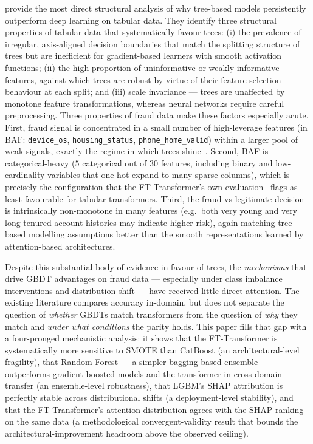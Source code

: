 \documentclass[a4paper,fleqn]{cas-sc}
\begin{document}
\citet{grinsztajn2022tree} provide the most direct structural analysis of why
tree-based models persistently outperform deep learning on tabular data.
They identify three structural properties of tabular data that systematically
favour trees: (i) the prevalence of irregular, axis-aligned decision boundaries
that match the splitting structure of trees but are inefficient for
gradient-based learners with smooth activation functions; (ii) the high
proportion of uninformative or weakly informative features, against which trees
are robust by virtue of their feature-selection behaviour at each split;
and (iii) scale invariance --- trees are unaffected by monotone feature
transformations, whereas neural networks require careful preprocessing.
Three properties of fraud data make these factors especially acute.
First, fraud signal is concentrated in a small number of high-leverage features
(in BAF: \texttt{device\_os}, \texttt{housing\_status}, \texttt{phone\_home\_valid})
within a larger pool of weak signals, exactly the regime in which trees
shine~\citep{grinsztajn2022tree,jesus2022turning}.
Second, BAF is categorical-heavy ($5$ categorical out of $30$ features,
including binary and low-cardinality variables that one-hot expand to many
sparse columns), which is precisely the configuration that the FT-Transformer's
own evaluation~\citep{gorishniy2021revisiting} flags as least favourable for
tabular transformers.
Third, the fraud-vs-legitimate decision is intrinsically non-monotone in many
features (e.g.\ both very young and very long-tenured account histories may
indicate higher risk), again matching tree-based modelling assumptions better
than the smooth representations learned by attention-based architectures.

Despite this substantial body of evidence in favour of trees, the
\emph{mechanisms} that drive GBDT advantages on fraud data --- especially under
class imbalance interventions and distribution shift --- have received little
direct attention.
The existing literature compares accuracy in-domain, but does not separate
the question of \emph{whether} GBDTs match transformers from the question of
\emph{why} they match and \emph{under what conditions} the parity holds.
This paper fills that gap with a four-pronged mechanistic analysis: it shows
that the FT-Transformer is systematically more sensitive to SMOTE than CatBoost
(an architectural-level fragility), that Random Forest --- a simpler
bagging-based ensemble --- outperforms gradient-boosted models and the
transformer in cross-domain transfer (an ensemble-level robustness), that
LGBM's SHAP attribution is perfectly stable across distributional shifts
(a deployment-level stability), and that the FT-Transformer's attention
distribution agrees with the SHAP ranking on the same data (a methodological
convergent-validity result that bounds the architectural-improvement headroom
above the observed ceiling).
\end{document}
